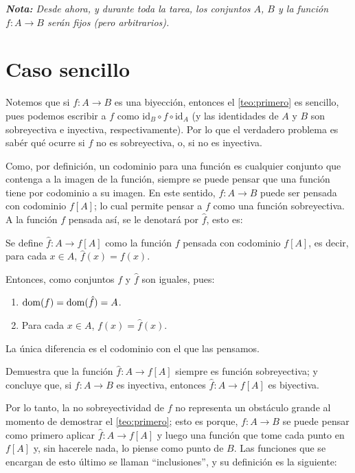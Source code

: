 \documentclass[letterpaper,DIV=14,headsepline,12pt]{scrartcl}
\newcommand{\pts}{}
\newenvironment{ejercicio}[1]{\ifthenelse{\equal{#1}{1} \OR
\equal{#1}{+1}}{\renewcommand{\pts}{\textbf{(#1
pt)}}}{\renewcommand{\pts}{\textbf{(#1 pts)}}}\begin{ejj}\upshape
\pts}{\end{ejj}}
\newcommand{\id}{\mathrm{id}} \newcommand{\op}{{}^{\mathrm{op}}}
\begin{document}
    \textit{\textbf{Nota:} Desde ahora, y durante toda la tarea, los conjuntos
    $A$, $B$ y la función $f\colon A \to B$ serán fijos (pero arbitrarios).}

    \section*{Caso sencillo}

    Notemos que si $f\colon A \to B$ es una biyección, entonces el
    \autoref{teo:primero} es sencillo, pues
    podemos escribir a $f$ como $\id_B \circ f \circ \id_A$ (y las identidades
    de $A$ y $B$ son sobreyectiva e inyectiva, respectivamente). Por lo que el
    verdadero problema es sabér qué ocurre si $f$ no es sobreyectiva, o, si no
    es inyectiva.

    Como, por definición, un codominio para una función es cualquier conjunto
    que contenga a la imagen de la función, siempre se puede pensar que una
    función tiene por codominio a su imagen. En este sentido, $f\colon A \to B$ puede
    ser pensada con codominio $f[A]$; lo cual permite pensar a $f$ como una
    función sobreyectiva. A la función $f$ pensada así, se le denotará por
    $\hat{f}$, esto es:

    \begin{definicion}
        Se define $\hat{f}\colon A \to f[A]$ como la función $f$ pensada con codominio
        $f[A]$, es decir, para cada $x \in A$, $\hat{f}(x)=f(x)$.
    \end{definicion}

    Entonces, como conjuntos $f$ y $\hat{f}$ son iguales, pues:
    \begin{enumerate}
        \item $\operatorname{dom}(f)=\operatorname{dom}(\hat{f})=A$.
        \item Para cada $x \in A$, $f(x)=\hat{f}(x)$.
    \end{enumerate}
    
    La única diferencia es el codominio con el que las pensamos.

    \begin{ejercicio}{1}\label{ej:sobresuimagen} Demuestra que la función
        $\hat{f}\colon A \to f[A]$ siempre es función sobreyectiva; y concluye que, si
        $f\colon A \to B$ es inyectiva, entonces $\hat{f}\colon A \to f[A]$ es biyectiva.
    \end{ejercicio}

    Por lo tanto, la no sobreyectividad de $f$ no representa un obstáculo grande
    al momento de demostrar el \autoref{teo:primero}; esto es porque, $f\colon A \to
    B$ se puede pensar como primero aplicar $\hat{f}\colon A \to f[A]$ y luego una
    función que tome cada punto en $f[A]$ y, sin hacerele nada, lo piense como
    punto de $B$. Las funciones que se encargan de esto último se llaman
    ``inclusiones'', y su definición es la siguiente:
\end{document}
